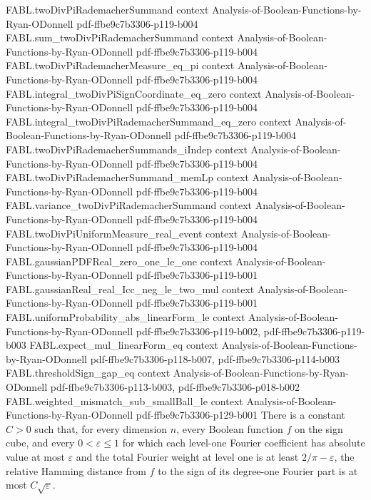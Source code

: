\begin{theorem}
\proofstep
  {FABL.twoDivPiRademacherSummand}
  {context}
  {Analysis-of-Boolean-Functions-by-Ryan-ODonnell}
  {pdf-ffbe9c7b3306-p119-b004}
\proofstep
  {FABL.sum_twoDivPiRademacherSummand}
  {context}
  {Analysis-of-Boolean-Functions-by-Ryan-ODonnell}
  {pdf-ffbe9c7b3306-p119-b004}
\proofstep
  {FABL.twoDivPiRademacherMeasure_eq_pi}
  {context}
  {Analysis-of-Boolean-Functions-by-Ryan-ODonnell}
  {pdf-ffbe9c7b3306-p119-b004}
\proofstep
  {FABL.integral_twoDivPiSignCoordinate_eq_zero}
  {context}
  {Analysis-of-Boolean-Functions-by-Ryan-ODonnell}
  {pdf-ffbe9c7b3306-p119-b004}
\proofstep
  {FABL.integral_twoDivPiRademacherSummand_eq_zero}
  {context}
  {Analysis-of-Boolean-Functions-by-Ryan-ODonnell}
  {pdf-ffbe9c7b3306-p119-b004}
\proofstep
  {FABL.twoDivPiRademacherSummands_iIndep}
  {context}
  {Analysis-of-Boolean-Functions-by-Ryan-ODonnell}
  {pdf-ffbe9c7b3306-p119-b004}
\proofstep
  {FABL.twoDivPiRademacherSummand_memLp}
  {context}
  {Analysis-of-Boolean-Functions-by-Ryan-ODonnell}
  {pdf-ffbe9c7b3306-p119-b004}
\proofstep
  {FABL.variance_twoDivPiRademacherSummand}
  {context}
  {Analysis-of-Boolean-Functions-by-Ryan-ODonnell}
  {pdf-ffbe9c7b3306-p119-b004}
\proofstep
  {FABL.twoDivPiUniformMeasure_real_event}
  {context}
  {Analysis-of-Boolean-Functions-by-Ryan-ODonnell}
  {pdf-ffbe9c7b3306-p119-b004}
\proofstep
  {FABL.gaussianPDFReal_zero_one_le_one}
  {context}
  {Analysis-of-Boolean-Functions-by-Ryan-ODonnell}
  {pdf-ffbe9c7b3306-p119-b001}
\proofstep
  {FABL.gaussianReal_real_Icc_neg_le_two_mul}
  {context}
  {Analysis-of-Boolean-Functions-by-Ryan-ODonnell}
  {pdf-ffbe9c7b3306-p119-b001}
\proofstep
  {FABL.uniformProbability_abs_linearForm_le}
  {context}
  {Analysis-of-Boolean-Functions-by-Ryan-ODonnell}
  {pdf-ffbe9c7b3306-p119-b002,
    pdf-ffbe9c7b3306-p119-b003}
\proofstep
  {FABL.expect_mul_linearForm_eq}
  {context}
  {Analysis-of-Boolean-Functions-by-Ryan-ODonnell}
  {pdf-ffbe9c7b3306-p118-b007,
    pdf-ffbe9c7b3306-p114-b003}
\proofstep
  {FABL.thresholdSign_gap_eq}
  {context}
  {Analysis-of-Boolean-Functions-by-Ryan-ODonnell}
  {pdf-ffbe9c7b3306-p113-b003,
    pdf-ffbe9c7b3306-p018-b002}
\proofstep
  {FABL.weighted_mismatch_sub_smallBall_le}
  {context}
  {Analysis-of-Boolean-Functions-by-Ryan-ODonnell}
  {pdf-ffbe9c7b3306-p129-b001}
There is a constant $C>0$ such that, for every dimension $n$, every Boolean function $f$
on the sign cube, and every $0<\varepsilon\le1$ for which each level-one Fourier
coefficient has absolute value at most $\varepsilon$ and the total Fourier weight at
level one is at least $2/\pi-\varepsilon$, the relative Hamming distance from $f$ to the
sign of its degree-one Fourier part is at most $C\sqrt{\varepsilon}$.
\end{theorem}

